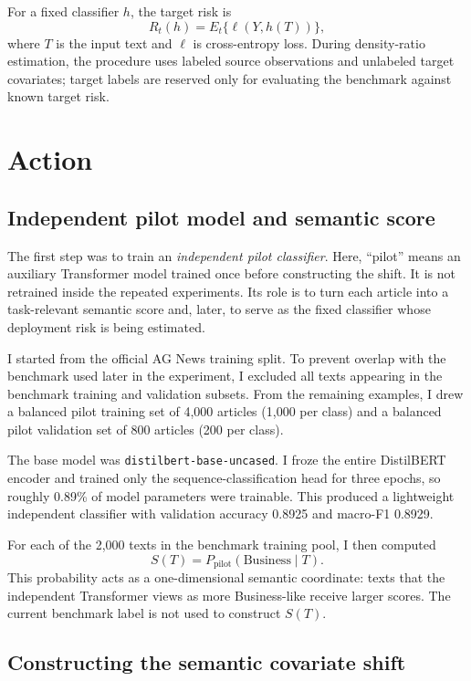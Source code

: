 \documentclass[11pt]{article}
\begin{document}
For a fixed classifier $h$, the target risk is
\[
R_t(h)=E_t\{\ell(Y,h(T))\},
\]
where $T$ is the input text and $\ell$ is cross-entropy loss. During density-ratio estimation, the procedure uses labeled source observations and unlabeled target covariates; target labels are reserved only for evaluating the benchmark against known target risk.

\section{Action}

\subsection{Independent pilot model and semantic score}

The first step was to train an \emph{independent pilot classifier}. Here, ``pilot'' means an auxiliary Transformer model trained once before constructing the shift. It is not retrained inside the repeated experiments. Its role is to turn each article into a task-relevant semantic score and, later, to serve as the fixed classifier whose deployment risk is being estimated.

I started from the official AG News training split. To prevent overlap with the benchmark used later in the experiment, I excluded all texts appearing in the benchmark training and validation subsets. From the remaining examples, I drew a balanced pilot training set of 4,000 articles (1,000 per class) and a balanced pilot validation set of 800 articles (200 per class).

The base model was \texttt{distilbert-base-uncased}. I froze the entire DistilBERT encoder and trained only the sequence-classification head for three epochs, so roughly 0.89\% of model parameters were trainable. This produced a lightweight independent classifier with validation accuracy 0.8925 and macro-F1 0.8929.

For each of the 2,000 texts in the benchmark training pool, I then computed
\[
S(T)=P_{\mathrm{pilot}}(\mathrm{Business}\mid T).
\]
This probability acts as a one-dimensional semantic coordinate: texts that the independent Transformer views as more Business-like receive larger scores. The current benchmark label is not used to construct $S(T)$.

\subsection{Constructing the semantic covariate shift}
\end{document}
